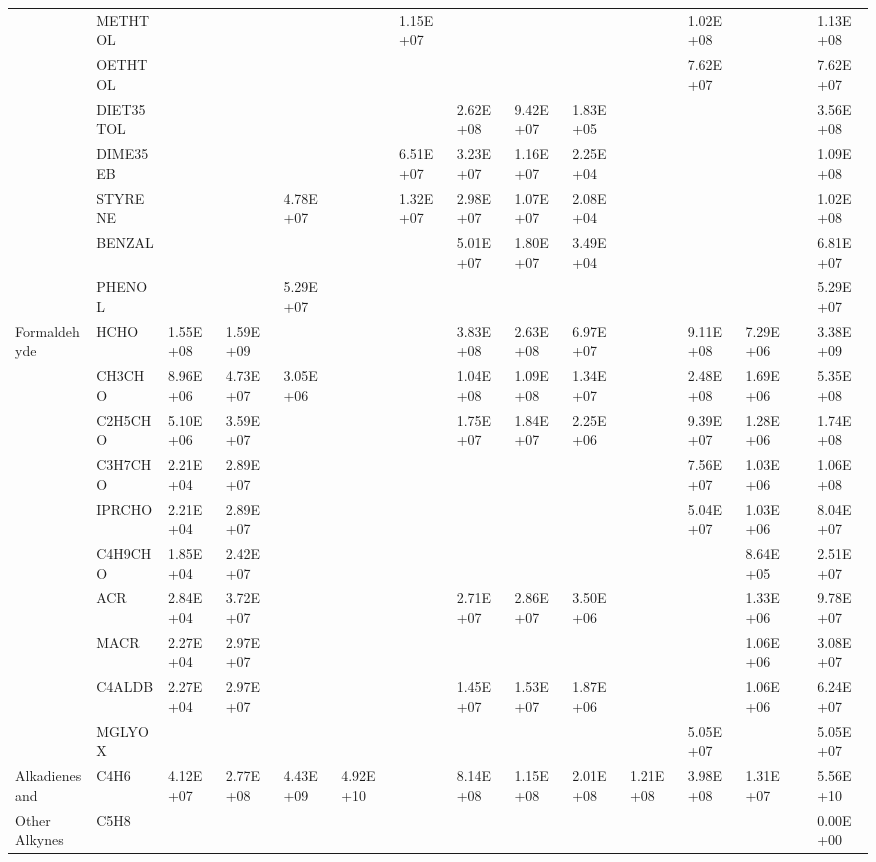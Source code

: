 \begin{longtable}{lllllllllllllll}
	 & METHTOL &  &  &  &  & 1.15E+07 &  &  &  &  & 1.02E+08 &  &  & 1.13E+08 \\
	 & OETHTOL &  &  &  &  &  &  &  &  &  & 7.62E+07 &  &  & 7.62E+07 \\
	 & DIET35TOL &  &  &  &  &  & 2.62E+08 & 9.42E+07 & 1.83E+05 &  &  &  &  & 3.56E+08 \\
	 & DIME35EB &  &  &  &  & 6.51E+07 & 3.23E+07 & 1.16E+07 & 2.25E+04 &  &  &  &  & 1.09E+08 \\
	 & STYRENE &  &  & 4.78E+07 &  & 1.32E+07 & 2.98E+07 & 1.07E+07 & 2.08E+04 &  &  &  &  & 1.02E+08 \\
	 & BENZAL &  &  &  &  &  & 5.01E+07 & 1.80E+07 & 3.49E+04 &  &  &  &  & 6.81E+07 \\
	 & PHENOL &  &  & 5.29E+07 &  &  &  &  &  &  &  &  &  & 5.29E+07 \\
	\hline Formaldehyde & HCHO & 1.55E+08 & 1.59E+09 &  &  &  & 3.83E+08 & 2.63E+08 & 6.97E+07 &  & 9.11E+08 & 7.29E+06 &  & 3.38E+09 \\ \hline
	\parbox[t]{2mm}{} & CH3CHO & 8.96E+06 & 4.73E+07 & 3.05E+06 &  &  & 1.04E+08 & 1.09E+08 & 1.34E+07 &  & 2.48E+08 & 1.69E+06 &  & 5.35E+08 \\
	 & C2H5CHO & 5.10E+06 & 3.59E+07 &  &  &  & 1.75E+07 & 1.84E+07 & 2.25E+06 &  & 9.39E+07 & 1.28E+06 &  & 1.74E+08 \\
	 & C3H7CHO & 2.21E+04 & 2.89E+07 &  &  &  &  &  &  &  & 7.56E+07 & 1.03E+06 &  & 1.06E+08 \\
	 & IPRCHO & 2.21E+04 & 2.89E+07 &  &  &  &  &  &  &  & 5.04E+07 & 1.03E+06 &  & 8.04E+07 \\
	 & C4H9CHO & 1.85E+04 & 2.42E+07 &  &  &  &  &  &  &  &  & 8.64E+05 &  & 2.51E+07 \\
	 & ACR & 2.84E+04 & 3.72E+07 &  &  &  & 2.71E+07 & 2.86E+07 & 3.50E+06 &  &  & 1.33E+06 &  & 9.78E+07 \\
	 & MACR & 2.27E+04 & 2.97E+07 &  &  &  &  &  &  &  &  & 1.06E+06 &  & 3.08E+07 \\
	 & C4ALDB & 2.27E+04 & 2.97E+07 &  &  &  & 1.45E+07 & 1.53E+07 & 1.87E+06 &  &  & 1.06E+06 &  & 6.24E+07 \\
	 & MGLYOX &  &  &  &  &  &  &  &  &  & 5.05E+07 &  &  & 5.05E+07 \\
	\hline Alkadienes and & C4H6 & 4.12E+07 & 2.77E+08 & 4.43E+09 & 4.92E+10 &  & 8.14E+08 & 1.15E+08 & 2.01E+08 & 1.21E+08 & 3.98E+08 & 1.31E+07 &  & 5.56E+10 \\
	Other Alkynes & C5H8 &  &  &  &  &  &  &  &  &  &  &  &  & 0.00E+00 \\

\end{longtable}
